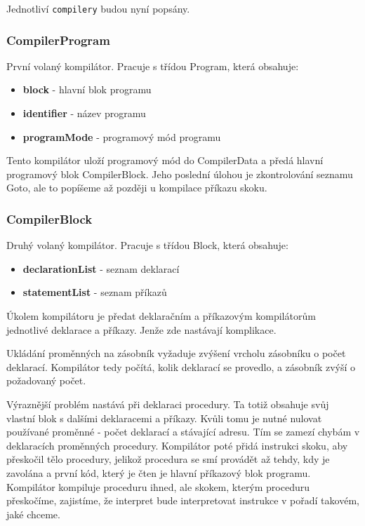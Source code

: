 \documentclass[
12pt,
a4paper,
pdftex,
czech,
titlepage
]{report}
\begin{document}
 Jednotliví \texttt{compilery} budou nyní popsány.
 
\subsubsection{CompilerProgram}
První volaný kompilátor. Pracuje s třídou Program, která obsahuje:
\begin{itemize}
\item \textbf{block} - hlavní blok programu
\item \textbf{identifier} - název programu
\item \textbf{programMode} - programový mód programu
\end{itemize}
    
    Tento kompilátor uloží programový mód do CompilerData a předá hlavní programový blok CompilerBlock. Jeho poslední úlohou je zkontrolování seznamu Goto, ale to popíšeme až později u kompilace příkazu skoku.
    
\subsubsection{CompilerBlock}
Druhý volaný kompilátor. Pracuje s třídou Block, která obsahuje:
\begin{itemize}
\item \textbf{declarationList} - seznam deklarací
\item \textbf{statementList} - seznam příkazů
\end{itemize}

Úkolem kompilátoru je předat deklaračním a příkazovým kompilátorům jednotlivé deklarace a příkazy. Jenže zde nastávají komplikace.

Ukládání proměnných na zásobník vyžaduje zvýšení vrcholu zásobníku o počet deklarací. Kompilátor tedy počítá, kolik deklarací se provedlo, a zásobník zvýší o požadovaný počet.

Výraznější problém nastává při deklaraci procedury. Ta totiž obsahuje svůj vlastní blok s dalšími deklaracemi a příkazy. Kvůli tomu je nutné nulovat používané proměnné - počet deklarací a stávající adresu. Tím se zamezí chybám v deklaracích proměnných procedury. Kompilátor poté přidá instrukci skoku, aby přeskočil tělo procedury, jelikož procedura se smí provádět až tehdy, kdy je zavolána a první kód, který je čten je hlavní příkazový blok programu. Kompilátor kompiluje proceduru ihned, ale skokem, kterým proceduru přeskočíme, zajistíme, že interpret bude interpretovat instrukce v pořadí takovém, jaké chceme. 
\end{document}
